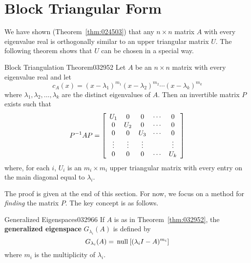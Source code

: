 \section{Block Triangular Form}
\label{sec:11_1}

We have shown (Theorem~\ref{thm:024503}) that any $n \times n$ matrix $A$ with every eigenvalue real is orthogonally similar to an upper triangular matrix $U$. The following theorem shows that $U$ can be chosen in a special way.


\begin{theorem}{Block Triangulation Theorem}{032952}
Let $A$ be an $n \times n$ matrix with every eigenvalue real and let
\begin{equation*}
c_A(x) = (x - \lambda_1)^{m_1}(x - \lambda_2)^{m_2} \cdots (x - \lambda_k)^{m_k}
\end{equation*}
where $\lambda_{1}, \lambda_{2}, \dots, \lambda_{k}$ are the distinct eigenvalues of $A$. Then an invertible matrix $P$ exists such that
\begin{equation*}
P^{-1}AP = \left[ \begin{array}{ccccc}
U_1 & 0 & 0 & \cdots & 0 \\
0 & U_2 & 0 & \cdots & 0 \\
0 & 0 & U_3 & \cdots & 0 \\ 
\vdots & \vdots & \vdots &  & \vdots \\
0 & 0 & 0 & \cdots & U_k
\end{array} \right]
\end{equation*}
where, for each $i$, $U_{i}$ is an $m_{i} \times m_{i}$ upper triangular matrix with every entry on the main diagonal equal to $\lambda_{i}$.
\end{theorem}

\noindent The proof is given at the end of this section. For now, we focus on a method for \textit{finding} the matrix $P$. The key concept is as follows.


\begin{definition}{Generalized Eigenspaces}{032966}
If $A$ is as in Theorem~\ref{thm:032952}, the \textbf{generalized eigenspace} $G_{\lambda_i}(A)$ is defined by
\begin{equation*}
G_{\lambda_i}(A) = \thinspace\operatorname{null\medspace}[(\lambda_{i}I - A)^{m_i}]
\end{equation*}
where $m_{i}$ is the multiplicity of $\lambda_{i}$.
\end{definition}

